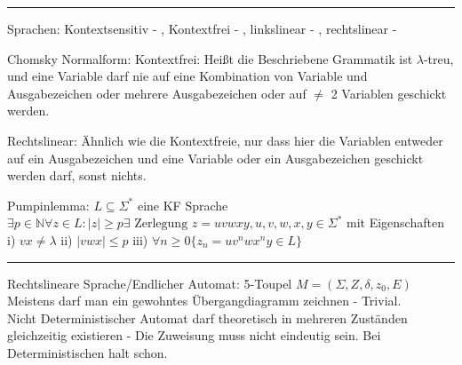 \documentclass[10pt,a4paper]{article} %
\begin{document}
	\rule{0.5\paperwidth}{0.5pt}
	
	Sprachen: Kontextsensitiv - , Kontextfrei - , linkslinear - , rechtslinear - 
	
	Chomsky Normalform: Kontextfrei: Heißt die Beschriebene Grammatik ist $\lambda$-treu, und eine Variable darf nie auf eine Kombination von Variable und Ausgabezeichen oder mehrere Ausgabezeichen oder auf $\ne$ 2 Variablen geschickt werden.
	
	Rechtslinear: Ähnlich wie die Kontextfreie, nur dass hier die Variablen entweder auf ein Ausgabezeichen und eine Variable oder ein Ausgabezeichen geschickt werden darf, sonst nichts.
	
	Pumpinlemma: $L \subseteq \Sigma^*$ eine KF Sprache $\exists p \in \mathbb{N} \forall z \in L: |z| \ge p \exists \text{ Zerlegung } z = uvwxy, u, v, w, x, y \in \Sigma^*$  mit Eigenschaften i) $vx \ne \lambda$ ii) $|vwx| \le p$ iii) $\forall n \ge 0 \{z_n = uv^nwx^ny \in L \}$
	
	\rule{0.5\paperwidth}{0.5pt}
	
	Rechtslineare Sprache/Endlicher Automat: 5-Toupel $M = (\Sigma, Z, \delta, z_0, E)$ \\
	Meistens darf man ein gewohntes Übergangdiagramm zeichnen - Trivial. \\
	Nicht Deterministischer Automat darf theoretisch in mehreren Zuständen gleichzeitig existieren - Die Zuweisung muss nicht eindeutig sein. Bei Deterministischen halt schon.
\end{document}

